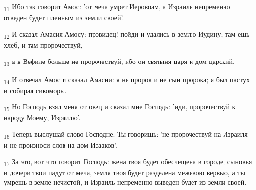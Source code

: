 \begin{tcolorbox}
\textsubscript{11} Ибо так говорит Амос: 'от меча умрет Иеровоам, а Израиль непременно отведен будет пленным из земли своей'.
\end{tcolorbox}
\begin{tcolorbox}
\textsubscript{12} И сказал Амасия Амосу: провидец! пойди и удались в землю Иудину; там ешь хлеб, и там пророчествуй,
\end{tcolorbox}
\begin{tcolorbox}
\textsubscript{13} а в Вефиле больше не пророчествуй, ибо он святыня царя и дом царский.
\end{tcolorbox}
\begin{tcolorbox}
\textsubscript{14} И отвечал Амос и сказал Амасии: я не пророк и не сын пророка; я был пастух и собирал сикоморы.
\end{tcolorbox}
\begin{tcolorbox}
\textsubscript{15} Но Господь взял меня от овец и сказал мне Господь: 'иди, пророчествуй к народу Моему, Израилю'.
\end{tcolorbox}
\begin{tcolorbox}
\textsubscript{16} Теперь выслушай слово Господне. Ты говоришь: 'не пророчествуй на Израиля и не произноси слов на дом Исааков'.
\end{tcolorbox}
\begin{tcolorbox}
\textsubscript{17} За это, вот что говорит Господь: жена твоя будет обесчещена в городе, сыновья и дочери твои падут от меча, земля твоя будет разделена межевою вервью, а ты умрешь в земле нечистой, и Израиль непременно выведен будет из земли своей.
\end{tcolorbox}
